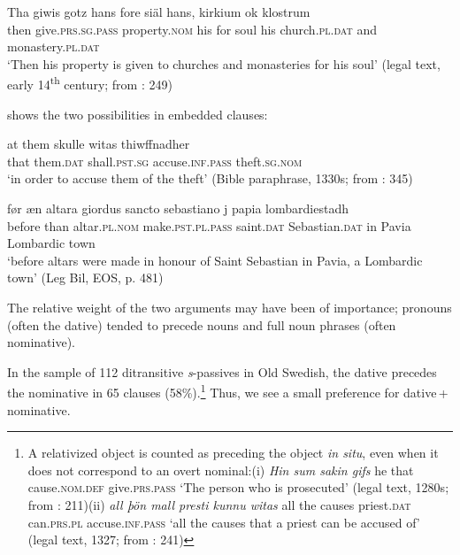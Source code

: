 \documentclass[output=paper]{langscibook}
\begin{document}
\ex \label{ex:falk:15b}
\gll Tha  giwis          gotz        hans  fore  siäl  hans,  kirkium ok    klostrum\\
    then  give.\textsc{prs.sg.pass}  property.\textsc{nom}  his    for    soul  his    church.\textsc{pl.dat}   and  monastery.\textsc{pl.dat}\\
\glt ‘Then his property is given to churches and monasteries for his soul’ (legal text, early 14\textsuperscript{th} century; from \citealt{Holm1952}: 249)
\z
\z

          shows the two possibilities in embedded clauses:

\ea%
    \label{ex:falk:16}

\ea
\gll at    them    skulle        witas            thiwffnadher\\
      that  them.\textsc{dat}  shall.\textsc{pst.sg}  accuse.\textsc{inf.pass}    theft.\textsc{sg.nom}\\
\glt ‘in order to accuse them of the theft’ (Bible paraphrase, 1330s; from \citealt{Holm1952}: 345)

\ex
\gll før      æn    altara        giordus          sancto      sebastiano j  papia   lombardiestadh\\
      before  than     altar\textsc{.pl.nom}  make.\textsc{pst.pl.pass}  saint.\textsc{dat}  Sebastian.\textsc{dat}       in Pavia    {Lombardic    town}\\
\glt ‘before altars were made in honour of Saint Sebastian in Pavia, a Lombardic town’ (Leg Bil, EOS, p. 481)
\z
\z


The relative weight of the two arguments may have been of importance; pronouns (often the dative) tended to precede nouns and full noun phrases (often nominative).  


In the sample of 112 ditransitive \textit{s}{}-passives in Old Swedish, the dative precedes the nominative in 65 clauses (58\%).\footnote{A relativized object is counted as preceding the object \textit{in situ}, even when it does not correspond to an overt nominal:(i)  \textit{Hin  sum  sakin          gifs}   he    that  cause.\textsc{nom.def}  give.\textsc{prs.pass}  ‘The person who is prosecuted’ (legal text, 1280s; from \citealt{Holm1952}: 211)(ii)  \textit{all    þön   mall  presti      kunnu  witas}   all    the    causes  priest.\textsc{dat}    can.\textsc{prs.pl}  accuse.\textsc{inf.pass}  ‘all the causes that a priest can be accused of’ (legal text, 1327; from \citealt{Holm1952}: 241)} Thus, we see a small preference for dative\,+\,nominative.
\end{document}
